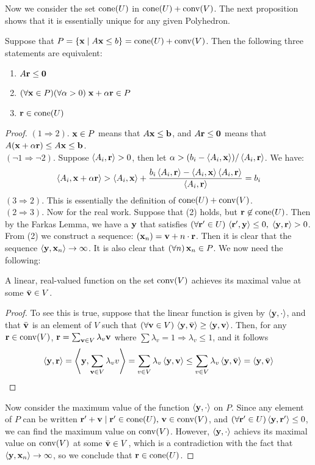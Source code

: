 Now we consider the set $\cone(U)$ in $\cone(U) + \conv(V)$.  The next proposition shows that it is essentially unique for any given Polyhedron.

\begin{Prop}\label{characteristic_cone}
	Suppose that $P = \HP{A}{b} = \VP{U}{V}$.  Then the following three statements are equivalent:
	\begin{enumerate}
		\item $A\r\leq\0$
		\item $(\forall \x\in P)(\forall \alpha > 0)\;\x + \alpha\r \in P$
		\item $\r \in \cone(U)$
	\end{enumerate}
\end{Prop}

\begin{proof}
	$(1 \Rightarrow 2)$. $\x\in P$ means that $A\x\leq\b$, and $A\r\leq\0$ means that $A(\x+\alpha\r) \leq A\x \leq \b$.\\
	$(\neg 1 \Rightarrow \neg 2)$.  Suppose $\ip{A_i}{\r} > 0$, then let $\alpha > (b_i - \ip{A_i}{\x})/\ip{A_i}{\r}$.  We have:
	\[ \ip{A_i}{\x + \alpha\r} > \ip{A_i}{\x} +
		\frac{b_i\ip{A_i}{\r} - \ip{A_i}{\x}\ip{A_i}{\r}}{\ip{A_i}{\r}} = b_i \]
	$(3 \Rightarrow 2)$.  This is essentially the definition of $\VP{U}{V}$.\\
	$(2 \Rightarrow 3)$.  Now for the real work.  Suppose that (2) holds, but $\r\not\in\cone(U)$.  Then by the Farkas Lemma, we have a $\y$ that satisfies $(\forall \r'\in U)\,\ip{\r'}{\y}\leq 0,\; \ip{\y}{\r} > 0$.  From (2) we construct a sequence: $(\x_n) = \v+n\cdot\r$.  Then it is clear that the sequence $\ip{\y}{\x_n} \to \infty$.  It is also clear that $(\forall n)\,\x_n \in P$.  We now need the following:
	\begin{Prop}\label{max_linear_func}
		A linear, real-valued function on the set $\conv(V)$ achieves its maximal value at some $\bar\v \in V$.
	\end{Prop}
	\begin{proof}
		To see this is true, suppose that the linear function is given by $\ip{\y}{\cdot}$, and that $\bar\v$ is an element of $V$ such that $(\forall \v \in V)\,\ip{\y}{\bar\v} \geq \ip{\y}{\v}$.  Then, for any $\r \in \conv(V)$, $\r = \sum_{\v\in V} \lambda_v\v$ where $\sum \lambda_v = 1 \Rightarrow \lambda_v \leq 1$, and it follows
		\[\ip{\y}{\r} = \ip{\y}{\sum_{\v\in V}\lambda_v v} = \sum_{v\in V} \lambda_v\ip{\y}{\v}
			\leq \sum_{v\in V}\lambda_v\ip{\y}{\bar\v} = \ip{\y}{\bar\v} \]
	\end{proof}
	Now consider the maximum value of the function $\ip{\y}{\cdot}$ on $P$.  Since any element of $P$ can be written $\r' + \v \st \r'\in\cone(U),\,\v\in\conv(V)$, and $(\forall\r'\in U) \ip{\y}{\r'} \leq 0$, we can find the maximum value on $\conv(V)$.  However, $\ip{\y}{\cdot}$ achievs its maximal value on $\conv(V)$ at some $\bar\v\in V$, which is a contradiction with the fact that $\ip{\y}{\x_n} \to \infty$, so we conclude that $\r\in\cone(U)$.
\end{proof}

